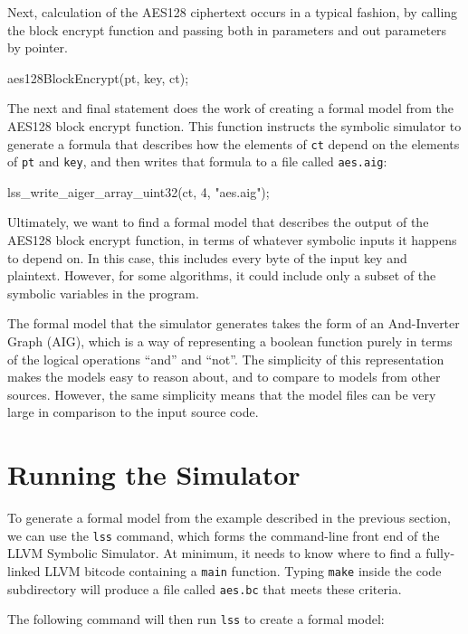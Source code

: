 \documentclass[11pt]{article}
\begin{document}
Next, calculation of the AES128 ciphertext occurs in a typical fashion,
by calling the block encrypt function and passing both in parameters and
out parameters by pointer.

\begin{code}
aes128BlockEncrypt(pt, key, ct);
\end{code}

The next and final statement does the work of creating a formal model
from the AES128 block encrypt function.  This function instructs the
symbolic simulator to generate a formula that describes how the elements
of \texttt{ct} depend on the elements of \texttt{pt} and \texttt{key},
and then writes that formula to a file called \texttt{aes.aig}:

\begin{code}
lss_write_aiger_array_uint32(ct, 4, "aes.aig");
\end{code}

Ultimately, we want to find a formal model that describes the output of
the AES128 block encrypt function, in terms of whatever symbolic inputs
it happens to depend on. In this case, this includes every byte of the
input key and plaintext. However, for some algorithms, it could include
only a subset of the symbolic variables in the program.

The formal model that the simulator generates takes the form of an
And-Inverter Graph (AIG), which is a way of representing a boolean
function purely in terms of the logical operations ``and'' and
``not''. The simplicity of this representation makes the models easy to
reason about, and to compare to models from other sources.  However, the
same simplicity means that the model files can be very large in
comparison to the input source code.

\section{Running the Simulator}

To generate a formal model from the example described in the previous
section, we can use the \texttt{lss} command, which forms the
command-line front end of the LLVM Symbolic Simulator. At minimum, it
needs to know where to find a fully-linked LLVM bitcode containing a
\texttt{main} function.  Typing \texttt{make} inside the code
subdirectory will produce a file called \texttt{aes.bc} that meets these
criteria.

The following command will then run \texttt{lss} to create a formal
model:
\end{document}
